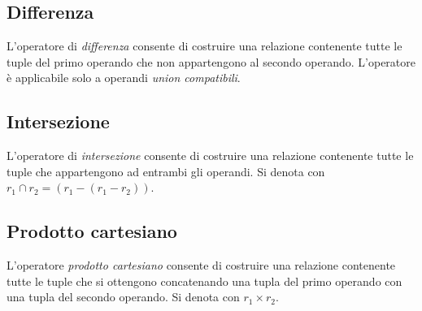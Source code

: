 \subsection{Differenza}
L'operatore di \emph{differenza} consente di costruire una relazione contenente tutte
le tuple del primo operando che non appartengono al secondo operando. L'operatore è
applicabile solo a operandi \emph{union compatibili}.

\subsection{Intersezione}
L'operatore di \emph{intersezione} consente di costruire una relazione contenente
tutte le tuple che appartengono ad entrambi gli operandi. Si denota con $r_1 \cap r_2 = 
(r_1 - (r_1 - r_2))$.

\subsection{Prodotto cartesiano}
L'operatore \emph{prodotto cartesiano} consente di costruire una relazione contenente
tutte le tuple che si ottengono concatenando una tupla del primo operando con una tupla
del secondo operando. Si denota con $r_1 \times r_2$.

